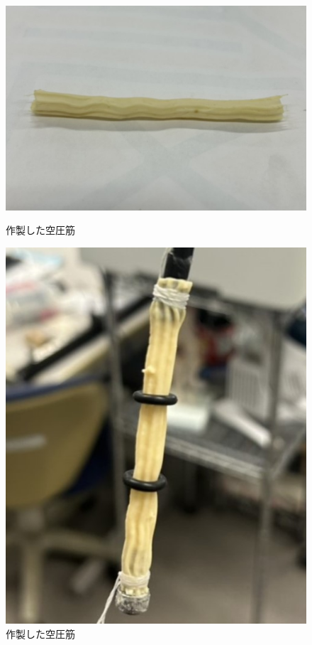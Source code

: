 \begin{figure}[htbp]
  \centering
  \begin{minipage}{0.49\hsize}
      \centering
      \includegraphics[scale=0.25]{pic/16.jpg}
      \caption{作製した空圧筋}
      \label{fig:16}
  \end{minipage} \hfill
  \begin{minipage}{0.49\hsize}
      \centering
      \includegraphics[scale=0.25]{pic/ww.jpg}
      \caption{作製した空圧筋}
      \label{fig:17}
  \end{minipage} 
\end{figure}
